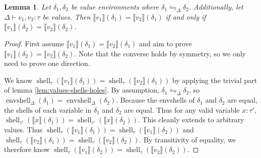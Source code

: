 \documentclass{report}
\newtheorem{lemma}{Lemma}
\theoremstyle{definition}
\newcommand{\den}[1]{\llbracket #1 \rrbracket}
\DeclareMathOperator{\shell}{shell}
\DeclareMathOperator{\envshell}{envshell}
\newcommand{\eqpat}{\leftrightharpoons}
\newcommand{\eqpatD}{\eqpat_{\Delta}}
\begin{document}
\begin{lemma}
	\label{lem:eqpat-substitution}
	Let \(\delta_1, \delta_2\) be value environments where \(\delta_1 \eqpatD \delta_2\).
	Additionally, let \(\Delta \vdash v_1, v_2 : \tau\) be values.
	Then \(\den{v_1}(\delta_1) = \den{v_2}(\delta_1)\) if and only if \(\den{v_1}(\delta_2) = \den{v_2}(\delta_2)\).
\end{lemma}
\begin{proof}
	First assume \(\den{v_1}(\delta_1) = \den{v_2}(\delta_1)\) and aim to prove \(\den{v_1}(\delta_2) = \den{v_2}(\delta_2)\).
	Note that the converse holds by symmetry, so we only need to prove one direction.

	We know \(\shell_{\tau}(\den{v_1}(\delta_1)) = \shell_{\tau}(\den{v_2}(\delta_1))\)
	by applying the trivial part of lemma \ref{lem:values-shells-holes}.
	By assumption, \(\delta_1 \eqpatD \delta_2\), so \(\envshell_\Delta(\delta_1) = \envshell_\Delta(\delta_2)\).
	Because the envshells of \(\delta_1\) and \(\delta_2\) are equal, the shells of each variable in \(\delta_1\) and \(\delta_2\) are equal.
	Thus for any valid variable \(x : \tau'\), \(\shell_{\tau'}(\den{x}(\delta_1)) = \shell_{\tau'}(\den{x}(\delta_2))\).
	This cleanly extends to arbitrary values.
	Thus \(\shell_\tau(\den{v_1}(\delta_1)) = \shell_\tau(\den{v_1}(\delta_2))\) and \(\shell_\tau(\den{v_2}(\delta_1)) = \shell_\tau(\den{v_2}(\delta_2))\).
	By transitivity of equality, we therefore know \(\shell_\tau(\den{v_1}(\delta_2)) = \shell_{\tau}(\den{v_2}(\delta_2))\).


\end{proof}
\end{document}

